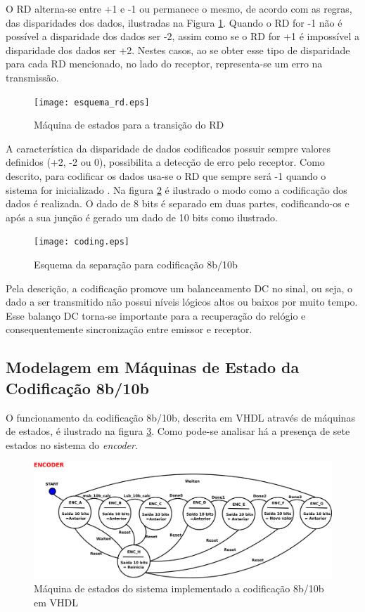 \documentclass[11pt,twocolumn]{article}
\begin{document}
O RD alterna-se entre +1 e -1 ou permanece o mesmo, de acordo com as regras, das disparidades dos dados, ilustradas na Figura \ref{rd}. Quando o RD for -1 não é possível a disparidade dos dados ser -2, assim como se o RD for +1 é impossível a disparidade dos dados ser +2. Nestes casos, ao se obter esse tipo de disparidade para cada RD mencionado, no lado do receptor, representa-se um erro na transmissão.

\begin{figure}[htb]
	\centering
	\texttt{[image: esquema\_rd.eps]}
	\caption{Máquina de estados para a transição do RD}
	\label{rd}
\end{figure}

A característica da disparidade de dados codificados possuir sempre valores definidos (+2, -2 ou 0), possibilita a detecção de erro pelo receptor. Como descrito, para codificar os dados usa-se o RD que sempre será -1 quando o sistema for inicializado \cite{Franaszek}. Na figura \ref{coding} é ilustrado o modo como a codificação dos dados é realizada. O dado de 8 bits é separado em duas partes, codificando-os e após a sua junção é gerado um dado de 10 bits como ilustrado.  

\begin{figure}[htb]
	\centering
	\texttt{[image: coding.eps]}
	\caption{Esquema da separação para codificação 8b/10b}
	\label{coding}
\end{figure}

Pela descrição, a codificação promove um balanceamento DC no sinal, ou seja, o dado a ser transmitido não possui níveis lógicos altos ou baixos por muito tempo. Esse balanço DC torna-se importante para a recuperação do relógio e consequentemente sincronização entre emissor e receptor.

\subsection{Modelagem em Máquinas de Estado da Codificação 8b/10b}

O funcionamento da codificação 8b/10b, descrita em VHDL através de máquinas de estados, é ilustrado na figura \ref{machine_system}. Como pode-se analisar há a presença de sete estados no sistema do \textit{encoder}. 

\begin{figure}[htb]
	\centering
	\includegraphics[scale=0.075]{FSM8b10b_v3.png}
	\caption{Máquina de estados do sistema implementado a codificação 8b/10b em VHDL}
	\label{machine_system}
\end{figure}
\end{document}
